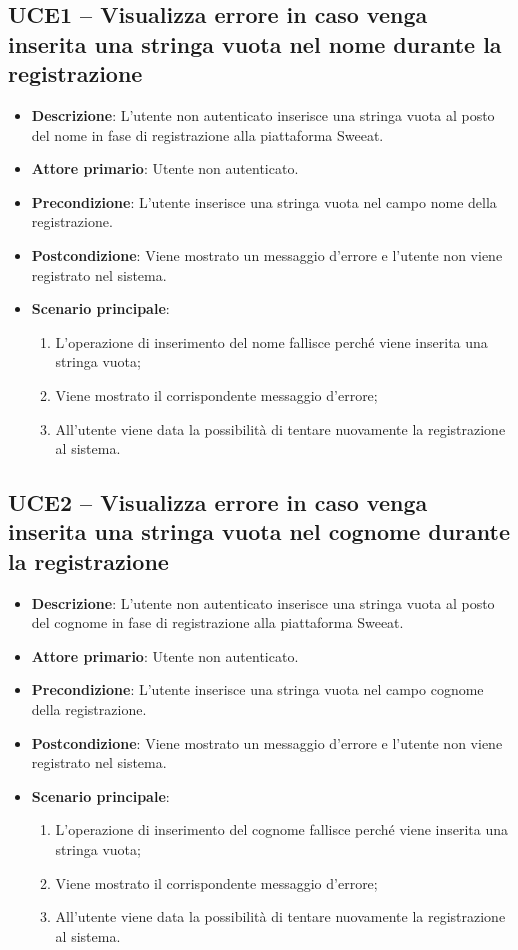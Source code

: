 \subsection{UCE1 – Visualizza errore in caso venga inserita una stringa vuota nel nome durante la registrazione}
\begin{itemize}
\item \textbf{Descrizione}: L'utente non autenticato inserisce una stringa vuota al posto del nome in fase di registrazione alla piattaforma Sweeat.
\item \textbf{Attore primario}: Utente non autenticato.
\item \textbf{Precondizione}: L'utente inserisce una stringa vuota nel campo nome della registrazione.
\item \textbf{Postcondizione}: Viene mostrato un messaggio d'errore e l'utente non viene registrato nel sistema.

\item \textbf{Scenario principale}:
\begin{enumerate}
\item L'operazione di inserimento del nome fallisce perché viene inserita una stringa vuota;
\item Viene mostrato il corrispondente messaggio d'errore;
\item All'utente viene data la possibilità di tentare nuovamente la registrazione al sistema.
\end{enumerate}
\end{itemize}

\subsection{UCE2 – Visualizza errore in caso venga inserita una stringa vuota nel cognome durante la registrazione}
\begin{itemize}
\item \textbf{Descrizione}: L'utente non autenticato inserisce una stringa vuota al posto del cognome in fase di registrazione alla piattaforma Sweeat.
\item \textbf{Attore primario}: Utente non autenticato.
\item \textbf{Precondizione}: L'utente inserisce una stringa vuota nel campo cognome della registrazione.
\item \textbf{Postcondizione}: Viene mostrato un messaggio d'errore e l'utente non viene registrato nel sistema.

\item \textbf{Scenario principale}:
\begin{enumerate}
\item L'operazione di inserimento del cognome fallisce perché viene inserita una stringa vuota;
\item Viene mostrato il corrispondente messaggio d'errore;
\item All'utente viene data la possibilità di tentare nuovamente la registrazione al sistema.
\end{enumerate}
\end{itemize}


